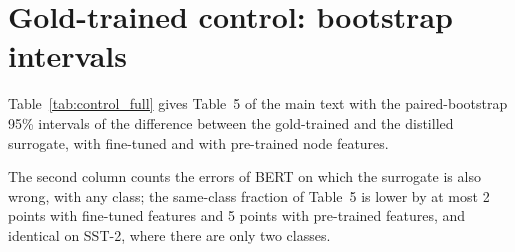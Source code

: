 \documentclass[review,12pt]{elsarticle}
\begin{document}
\section{Gold-trained control: bootstrap intervals}

Table~\ref{tab:control_full} gives Table~5 of the main text with the paired-bootstrap 95\% intervals of the difference between the gold-trained and the distilled surrogate, with fine-tuned and with pre-trained node features.

The second column counts the errors of BERT on which the surrogate is also wrong, with any class; the same-class fraction of Table~5 is lower by at most 2 points with fine-tuned features and 5 points with pre-trained features, and identical on SST-2, where there are only two classes.

\begin{table}[H]
\centering
\scriptsize
\setlength{\tabcolsep}{4pt}
\caption{Gold-trained control with intervals, with fine-tuned (upper block) and pre-trained (lower block) node features: accuracy with respect to the gold labels, fraction of BERT's errors on which the surrogate is also wrong (any class), and fraction on which it gives BERT's wrong class with confidence above 0.9. \(\Delta\): gold-trained minus distilled surrogate, with a paired-bootstrap 95\% interval.}
\label{tab:control_full}
\end{table}
\end{document}
